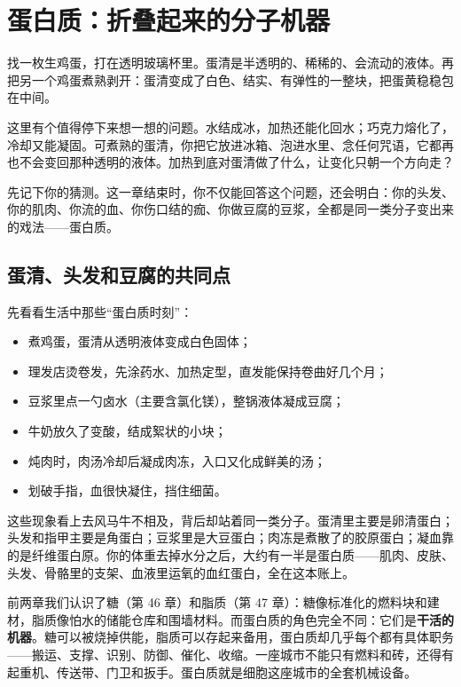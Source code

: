 \chapter{蛋白质：折叠起来的分子机器}

\begin{kaichang}
找一枚生鸡蛋，打在透明玻璃杯里。蛋清是半透明的、稀稀的、会流动的液体。再把另一个鸡蛋煮熟剥开：蛋清变成了白色、结实、有弹性的一整块，把蛋黄稳稳包在中间。

这里有个值得停下来想一想的问题。水结成冰，加热还能化回水；巧克力熔化了，冷却又能凝固。可煮熟的蛋清，你把它放进冰箱、泡进水里、念任何咒语，它都再也不会变回那种透明的液体。加热到底对蛋清做了什么，让变化只朝一个方向走？

先记下你的猜测。这一章结束时，你不仅能回答这个问题，还会明白：你的头发、你的肌肉、你流的血、你伤口结的痂、你做豆腐的豆浆，全都是同一类分子变出来的戏法——蛋白质。
\end{kaichang}

\section{蛋清、头发和豆腐的共同点}

先看看生活中那些“蛋白质时刻”：

\begin{itemize}[itemsep=2pt]
\item 煮鸡蛋，蛋清从透明液体变成白色固体；
\item 理发店烫卷发，先涂药水、加热定型，直发能保持卷曲好几个月；
\item 豆浆里点一勺卤水（主要含氯化镁），整锅液体凝成豆腐；
\item 牛奶放久了变酸，结成絮状的小块；
\item 炖肉时，肉汤冷却后凝成肉冻，入口又化成鲜美的汤；
\item 划破手指，血很快凝住，挡住细菌。
\end{itemize}

这些现象看上去风马牛不相及，背后却站着同一类分子。蛋清里主要是卵清蛋白；头发和指甲主要是角蛋白；豆浆里是大豆蛋白；肉冻是煮散了的胶原蛋白；凝血靠的是纤维蛋白原。你的体重去掉水分之后，大约有一半是蛋白质——肌肉、皮肤、头发、骨骼里的支架、血液里运氧的血红蛋白，全在这本账上。

前两章我们认识了糖（第 46 章）和脂质（第 47 章）：糖像标准化的燃料块和建材，脂质像怕水的储能仓库和围墙材料。而蛋白质的角色完全不同：它们是\textbf{干活的机器}。糖可以被烧掉供能，脂质可以存起来备用，蛋白质却几乎每个都有具体职务——搬运、支撑、识别、防御、催化、收缩。一座城市不能只有燃料和砖，还得有起重机、传送带、门卫和扳手。蛋白质就是细胞这座城市的全套机械设备。

